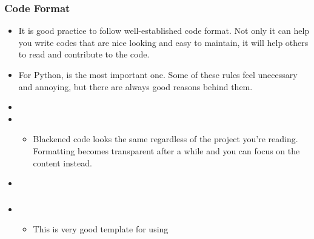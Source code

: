 \documentclass[letterpaper,10pt,english]{sphinxmanual}
\begin{document}
\subsubsection{Code Format}
\label{\detokenize{resource/programing/python_write_your_project:code-format}}\begin{itemize}
\item {} 
It is good practice to follow well-established code format. Not only
it can help you write codes that are nice looking and easy to
maintain, it will help others to read and contribute to the code.

\item {} 
For Python,  is the most
important one. Some of these rules feel unecessary and annoying, but
there are always good reasons behind them.

\item {} 

\item {} 
\begin{itemize}
\item {} 
Blackened code looks the same regardless of the project you’re
reading. Formatting becomes transparent after a while and you can
focus on the content instead.

\end{itemize}

\item {} 

\end{itemize}


\subsubsection{}
\label{\detokenize{resource/programing/python_write_your_project:setup-py}}\begin{itemize}
\item {} 
\begin{itemize}
\item {} 
This is very good template for using 

\end{itemize}

\end{itemize}
\end{document}
